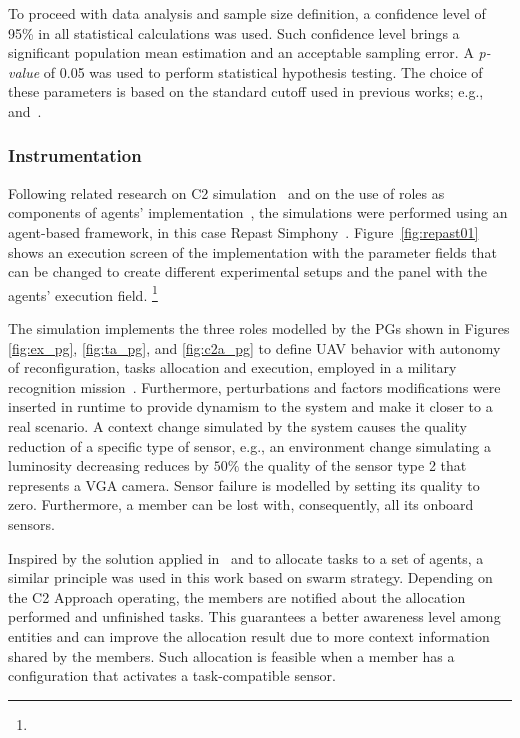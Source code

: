 To proceed with data analysis and sample size definition, a confidence level of 95\% in all statistical calculations was used. Such confidence level brings a significant population mean estimation and an acceptable sampling error. A \emph{p-value} of 0.05 was used to perform statistical hypothesis testing. The choice of these parameters is based on the standard cutoff used in \color{black}previous works; e.g.,~\citet{CochranW.G.1983} and~\citet{Bruce2014}. \color{black}


\subsubsection{Instrumentation}
\label{sssec:instrumentation}

Following related research on C2 simulation~\citep{FRANCE2014, Fernandes2016, Stanton2007, c2-02} and on the use of roles as components of agents' implementation~\citep{agent0010, agent1}, the simulations were performed using an agent-based framework, in this case Repast Simphony~\citep{North2013, SIMUL01, ClaesWohlinPerRuneson2012}. Figure~\ref{fig:repast01} shows an execution screen of the implementation with the parameter fields that can be changed to create different experimental setups and the panel with the agents' execution field. \footnote{\executions}

The simulation implements the three roles modelled by the PGs shown in Figures \color{black} \ref{fig:ex_pg}, \ref{fig:ta_pg}, and \ref{fig:c2a_pg}  \color{black} to define UAV behavior with autonomy of reconfiguration, tasks allocation and execution, employed in a military recognition mission~\citep{UAV_Aplication}. Furthermore, perturbations and factors modifications were inserted in runtime to provide dynamism to the system and make it closer to a real scenario. A context change simulated by the system causes the quality reduction of a specific type of sensor, e.g., an environment change simulating a luminosity decreasing \color{black} reduces by $50\%$ \color{black} the quality of the sensor type 2 that represents a VGA camera. Sensor failure is modelled by setting its quality to zero. Furthermore, a member \color{black} can be lost with, consequently, \color{black} all its onboard sensors.

Inspired by the solution applied in~\citet{MAS07} and \citet{UAV01} to allocate tasks to a set of agents, a similar principle was used in this work based on swarm strategy. Depending on the C2 Approach \color{black}operating\color{black}, the members are notified about the allocation performed and unfinished tasks. This guarantees a better awareness level among entities and can improve the allocation result due to more context information shared by the members. Such allocation is feasible when a member has a configuration that activates a \color{black}task-compatible sensor\color{black}.

